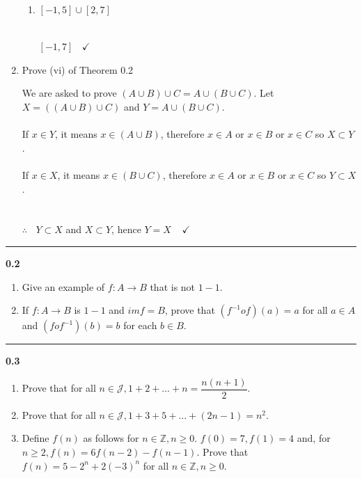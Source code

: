 \documentclass[fleqn]{article}
\begin{document}
\begin{enumerate}
\begin{enumerate}
      \item $[-1, 5] \cup [2, 7]$

        \textcolor{hwColor}{
          \\
          $
            [-1, 7] ~~~~ \checkmark
          $
          \\
        }

    \end{enumerate}

    \item Prove (vi) of Theorem 0.2
    
      \textcolor{hwColor}{
        We are asked to prove $(A \cup B) \cup C=A \cup (B \cup C)$. Let $X=((A \cup B) \cup C)$ and $Y=A \cup (B \cup C)$. 
        \\
        \\
        If $x \in Y$, it means $x \in (A \cup B)$, therefore $x \in A$ or $x \in B$ or $x \in C$ so $X \subset Y$.
        \\
        \\
        If $x \in X$, it means $x \in (B \cup C)$, therefore $x \in A$ or $x \in B$ or $x \in C$ so $Y \subset X$.
        \\
        \\
        \\
        $\therefore ~~~~ Y \subset X$ and $X \subset Y$, hence $Y=X ~~~~~ \checkmark$ 
      }

  \end{enumerate}

  \rule{15cm}{2pt}

  \textbf{0.2}
  \begin{enumerate}
    \item Give an example of $f: A \rightarrow B$ that is not $1-1$.

    \item If $f: A \rightarrow B$ is $1-1$ and $im f=B$, prove that $(f^{-1}of)(a)=a$
    for all $a \in A$ and $(fof^{-1})(b)=b$ for each $b \in B$.
  \end{enumerate}

  \rule{15cm}{2pt}

  \textbf{0.3}
  \begin{enumerate}
    \item Prove that for all $n \in \mathcal{J}, 1+2+...+n=\dfrac{n(n+1)}{2}$.

    \item Prove that for all $n \in \mathcal{J}, 1+3+5+...+(2n-1)=n^2$.

    \item Define $f(n)$ as follows for $n \in \mathbb{Z}, n\geqslant 0$. $f(0)=7, f(1)=4$ 
    and, for $n \geqslant 2, f(n)=6f(n-2)-f(n-1)$. Prove that $f(n)=5-2^n+2(-3)^n$ for 
    all $n \in \mathbb{Z}, n \geqslant 0$.
  \end{enumerate}
\end{document}
